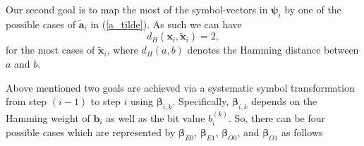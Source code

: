 \documentclass[12pt, draftclsnofoot, onecolumn]{IEEEtran}
\newcommand{\mb}[1]{\boldsymbol{#1}}
\begin{document}
Our second goal is to map the most of the symbol-vectors in $\mb{\psi}_{i}$ by one of the possible cases of $\tilde{\mb{a}}_{i}$ in (\ref{a_tilde}). As such  we can have 
\begin{equation}
\label{second-goals}
d_{H}(\mb{x}_{i},\tilde{\mb{x}}_{i}) = 2,
\end{equation} for the most cases of $\tilde{\mb{x}}_{i}$, where $d_{H}(a,b)$ denotes the 
Hamming distance between $a$ and $b$. \color{black}

Above mentioned two  goals are achieved via a systematic    symbol transformation    from step $(i-1)$ to step $i$ using $\mb{\beta}_{i,k}$. %
 Specifically, $\mb{\beta}_{i,k}$
 depends on the Hamming weight  of $\mb{b}_{i}$  as well as the bit value ${b}_{i}^{(k)}$.  So, there can be  four possible cases  which are  represented by  $\mb{\beta}_{E0}$, $\mb{\beta}_{E1}$, $\mb{\beta}_{O0}$, and $\mb{\beta}_{O1}$ as follows  
 
\end{document}
